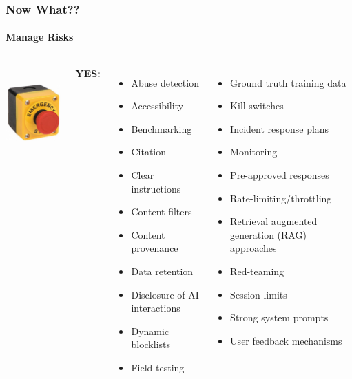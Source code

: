\documentclass[11pt,
               aspectratio=169,
               hyperref={colorlinks}
               ]{beamer}
\begin{document}
		\begin{frame}[t]
			
			\frametitle{Now What??}
			\framesubtitle{Manage Risks}
			
			\begin{columns}
				
					\vspace{5pt}
					\centering
					\includegraphics[height=100pt]{../img/buzzer.png}
				
					\textbf{YES:}
					
					\begin{columns}
						
						\begin{itemize}\tiny
							\item Abuse detection
							\item Accessibility
							\item Benchmarking
							\item Citation						
							\item Clear instructions
							\item Content filters
							\item Content provenance						
							\item Data retention
							\item Disclosure of AI interactions
							\item Dynamic blocklists
							\item Field-testing
						\end{itemize}
						
						\begin{itemize}\tiny
							\item Ground truth training data
							\item Kill switches					
							\item Incident response plans
							\item Monitoring
							\item Pre-approved responses
							\item Rate-limiting/throttling 
							\item Retrieval augmented generation (RAG) approaches
							\item Red-teaming
							\item Session limits
							\item Strong system prompts
							\item User feedback mechanisms
						\end{itemize}
						

\end{columns}
\end{columns}
\end{frame}
\end{document}
